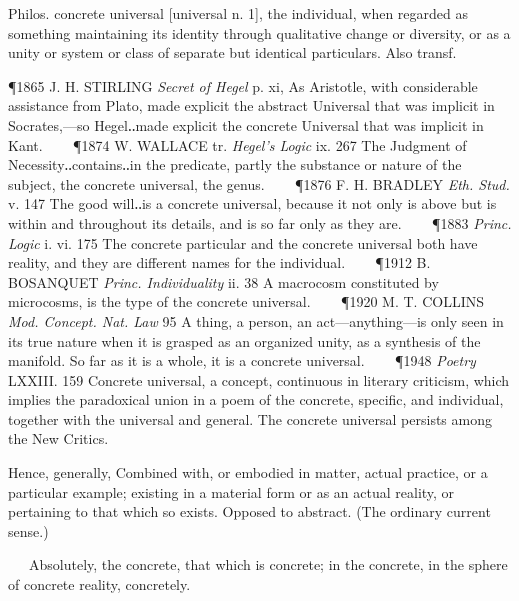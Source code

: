 \begin{description}[wide, labelwidth=!, labelindent=0pt]
\begin{myenumerate}
 Philos. concrete universal [universal n. 1], the individual, when regarded as something maintaining its identity through qualitative change or diversity, or as a unity or system or class of separate but identical particulars. Also transf.

\P 1865 J. H. STIRLING  \textit{Secret of Hegel} p. xi, As Aristotle, with considerable assistance from Plato, made explicit the abstract Universal that was implicit in Socrates,—so Hegel‥made explicit the concrete Universal that was implicit in Kant.    
\P 1874 W. WALLACE tr. \textit{Hegel's Logic} ix. 267 The Judgment of Necessity‥contains‥in the predicate, partly the substance or nature of the subject, the concrete universal, the genus.    
\P 1876 F. H. BRADLEY  \textit{Eth. Stud.} v. 147 The good will‥is a concrete universal, because it not only is above but is within and throughout its details, and is so far only as they are.    
\P 1883 \textit{Princ. Logic} i. vi. 175 The concrete particular and the concrete universal both have reality, and they are different names for the individual.    
\P 1912 B. BOSANQUET  \textit{Princ. Individuality} ii. 38 A macrocosm constituted by microcosms, is the type of the concrete universal.    
\P 1920 M. T. COLLINS  \textit{Mod. Concept. Nat. Law} 95 A thing, a person, an act—anything—is only seen in its true nature when it is grasped as an organized unity, as a synthesis of the manifold. So far as it is a whole, it is a concrete universal.    
\P 1948 \textit{Poetry}  LXXIII. 159 Concrete universal, a concept, continuous in literary criticism, which implies the paradoxical union in a poem of the concrete, specific, and individual, together with the universal and general. The concrete universal persists among the New Critics.

 Hence, generally, Combined with, or embodied in matter, actual practice, or a particular example; existing in a material form or as an actual reality, or pertaining to that which so exists. Opposed to abstract. (The ordinary current sense.)

   Absolutely, the concrete, that which is concrete; in the concrete, in the sphere of concrete reality, concretely.


\end{myenumerate}
\end{description}
